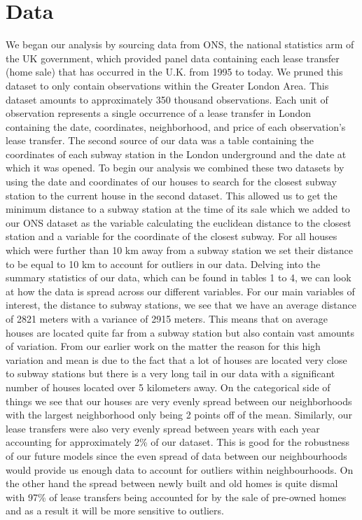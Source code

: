 \section{Data}
\label{sec:data}
We began our analysis by sourcing data from ONS, the national statistics arm of the UK government,
 which provided panel data containing each lease transfer (home sale) that has occurred in the U.K. from 1995 to today.
  We pruned this dataset to only contain observations within the Greater London Area.
   This dataset amounts to approximately 350 thousand observations. Each unit of observation represents
    a single occurrence of a lease transfer in London containing the date, coordinates, neighborhood, and price of each observation's
     lease transfer.  The second source of our data was a table containing the coordinates of each subway station in the
      London underground and the date at which it was opened. 
To begin our analysis we combined these two datasets by using the date and coordinates of our houses to search for the closest
 subway station to the current house in the second dataset. This allowed us to get the minimum distance to a subway station at
  the time of its sale which we added to our ONS dataset as the variable calculating the euclidean distance to the closest station
   and a variable for the coordinate of the closest subway. For all houses which were further than 10 km away from a subway station
    we set their distance to be equal to 10 km to account for outliers in our data.
Delving into the summary statistics of our data, which can be found in tables 1 to 4, we can look at how the data is spread
 across our different variables. For our main variables of interest, the distance to subway stations, we see that we have an
  average distance of 2821 meters with a variance of 2915 meters. This means that on average houses are located quite far from
   a subway station but also contain vast amounts of variation. From our earlier work on the matter the reason for this high
    variation and mean is due to the fact that a lot of houses are located very close to subway stations but there is a very
     long tail in our data with a significant number of houses located over 5 kilometers away. 
On the categorical side of things we see that our houses are very evenly spread between our neighborhoods with the largest
 neighborhood only being 2 points off of the mean. Similarly, our lease transfers were also very evenly spread between years
  with each year accounting for approximately 2\% 
  of our dataset. This is good for the robustness of our future models since the even spread of data between 
  our neighbourhoods would provide us enough data to account for outliers within neighbourhoods. 
  On the other hand the spread between newly built and old homes is quite dismal with 97\%
   of lease transfers being accounted for by the sale of pre-owned homes and as a result it will be more sensitive to outliers.
